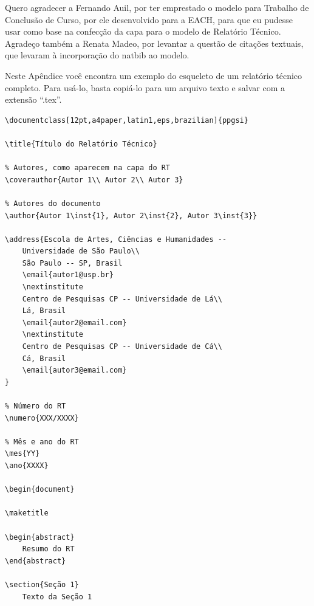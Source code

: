 \documentclass[12pt,a4paper,utf8]{ppgsi}
\begin{document}
	Quero agradecer a Fernando Auil, por ter emprestado o modelo para Trabalho de Conclusão de Curso, por ele desenvolvido para a EACH, para que eu pudesse usar como base na confecção da capa para o modelo de Relatório Técnico. Agradeço também a Renata Madeo, por levantar a questão de citações textuais, que levaram à incorporação do natbib ao modelo.
	
	



\appendix

\label{ap:exemplo}

	Neste Apêndice você encontra um exemplo do esqueleto de um relatório técnico completo. Para usá-lo, basta copiá-lo para um arquivo texto e salvar com a extensão ``.tex''.

\begin{verbatim}
\documentclass[12pt,a4paper,latin1,eps,brazilian]{ppgsi}

\title{Título do Relatório Técnico}

% Autores, como aparecem na capa do RT
\coverauthor{Autor 1\\ Autor 2\\ Autor 3}

% Autores do documento
\author{Autor 1\inst{1}, Autor 2\inst{2}, Autor 3\inst{3}}

\address{Escola de Artes, Ciências e Humanidades --
    Universidade de São Paulo\\
    São Paulo -- SP, Brasil
    \email{autor1@usp.br}
    \nextinstitute
    Centro de Pesquisas CP -- Universidade de Lá\\
    Lá, Brasil
    \email{autor2@email.com}
    \nextinstitute
    Centro de Pesquisas CP -- Universidade de Cá\\
    Cá, Brasil
    \email{autor3@email.com}
}

% Número do RT
\numero{XXX/XXXX}

% Mês e ano do RT
\mes{YY}
\ano{XXXX}

\begin{document}

\maketitle

\begin{abstract}
    Resumo do RT
\end{abstract}

\section{Seção 1}
    Texto da Seção 1


\end{verbatim}
\end{document}
